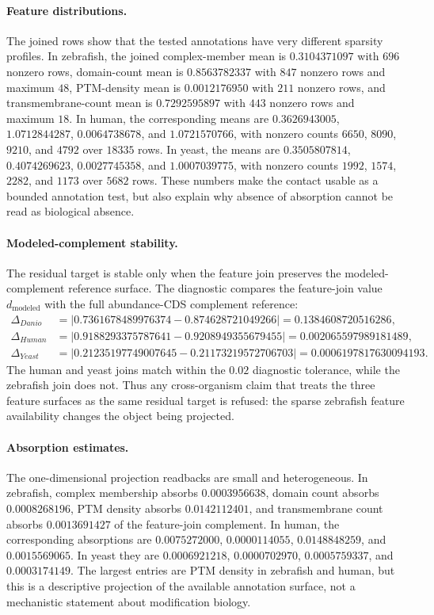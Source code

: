 \paragraph{Feature distributions.}
The joined rows show that the tested annotations have very different sparsity profiles. In zebrafish, the joined complex-member mean is $0.3104371097$ with $696$ nonzero rows, domain-count mean is $0.8563782337$ with $847$ nonzero rows and maximum $48$, PTM-density mean is $0.0012176950$ with $211$ nonzero rows, and transmembrane-count mean is $0.7292595897$ with $443$ nonzero rows and maximum $18$. In human, the corresponding means are $0.3626943005$, $1.0712844287$, $0.0064738678$, and $1.0721570766$, with nonzero counts $6650$, $8090$, $9210$, and $4792$ over $18335$ rows. In yeast, the means are $0.3505807814$, $0.4074269623$, $0.0027745358$, and $1.0007039775$, with nonzero counts $1992$, $1574$, $2282$, and $1173$ over $5682$ rows. These numbers make the contact usable as a bounded annotation test, but also explain why absence of absorption cannot be read as biological absence.

\paragraph{Modeled-complement stability.}
The residual target is stable only when the feature join preserves the modeled-complement reference surface. The diagnostic compares the feature-join value $d_{\mathrm{modeled}}$ with the full abundance-CDS complement reference:
$$
\begin{aligned}
\Delta_{Danio} &= |0.7361678489976374-0.874628721049266| = 0.1384608720516286,\\
\Delta_{Human} &= |0.9188293375787641-0.9208949355679455| = 0.002065597989181489,\\
\Delta_{Yeast} &= |0.21235197749007645-0.21173219572706703| = 0.0006197817630094193.
\end{aligned}
$$
The human and yeast joins match within the $0.02$ diagnostic tolerance, while the zebrafish join does not. Thus any cross-organism claim that treats the three feature surfaces as the same residual target is refused: the sparse zebrafish feature availability changes the object being projected.

\paragraph{Absorption estimates.}
The one-dimensional projection readbacks are small and heterogeneous. In zebrafish, complex membership absorbs $0.0003956638$, domain count absorbs $0.0008268196$, PTM density absorbs $0.0142112401$, and transmembrane count absorbs $0.0013691427$ of the feature-join complement. In human, the corresponding absorptions are $0.0075272000$, $0.0000114055$, $0.0148848259$, and $0.0015569065$. In yeast they are $0.0006921218$, $0.0000702970$, $0.0005759337$, and $0.0003174149$. The largest entries are PTM density in zebrafish and human, but this is a descriptive projection of the available annotation surface, not a mechanistic statement about modification biology.

